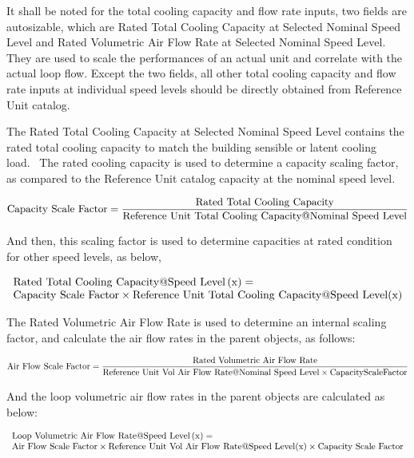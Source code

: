 It shall be noted for the total cooling capacity and flow rate inputs, two fields are autosizable, which are Rated Total Cooling Capacity at Selected Nominal Speed Level and Rated Volumetric Air Flow Rate at Selected Nominal Speed Level. They are used to scale the performances of an actual unit and correlate with the actual loop flow. Except the two fields, all other total cooling capacity and flow rate inputs at individual speed levels should be directly obtained from Reference Unit catalog.

The Rated Total Cooling Capacity at Selected Nominal Speed Level contains the rated total cooling capacity to match the building sensible or latent cooling load.~ The rated cooling capacity is used to determine a capacity scaling factor, as compared to the Reference Unit catalog capacity at the nominal speed level.

\begin{equation}
{\rm{Capacity~Scale~Factor}} = \frac{{{\rm{Rated~Total~Cooling~Capacity}}}}{{{\rm{Reference~Unit~Total~Cooling~Capacity}}@{\rm{Nominal~Speed~Level}}}}
\end{equation}

And then, this scaling factor is used to determine capacities at rated condition for other speed levels, as below,

\begin{equation}
\begin{array}{l}
{\rm{Rated~Total~Cooling~Capacity}}@{\rm{Speed~Level}}\left( {\rm{x}} \right) = \\
{\rm{Capacity~Scale~Factor}} \times {\rm{Reference~Unit~Total~Cooling~Capacity}}@{\rm{Speed~Level}}({\rm{x}})
\end{array}
\end{equation}

The Rated Volumetric Air Flow Rate is used to determine an internal scaling factor, and calculate the air flow rates in the parent objects, as follows:

\begin{equation}
{\rm{Air~Flow~Scale~Factor}} = \frac{{{\rm{Rated~Volumetric~Air~Flow~Rate}}}}{{{\rm{Reference~Unit~Vol~Air~Flow~Rate}}@{\rm{Nominal~Speed~Level}} \times {\rm{CapacityScaleFactor}}}}
\end{equation}

And the loop volumetric air flow rates in the parent objects are calculated as below:

\begin{equation}
\begin{array}{l}
{\rm{Loop~Volumetric~Air~Flow~Rate}}@{\rm{Speed~Level}}\left( {\rm{x}} \right) = \\ {\rm{Air~Flow~Scale~Factor}} \times {\rm{Reference~Unit~Vol~Air~Flow~Rate}}@{\rm{Speed~Level}}({\rm{x}}) \times {\rm{Capacity~Scale~Factor}}
\end{array}
\end{equation}

